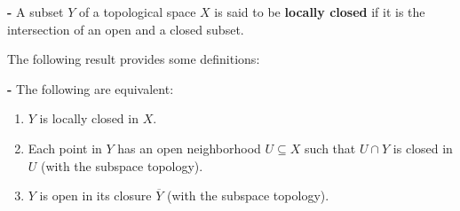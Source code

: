 \documentclass[12pt]{article}
\begin{document}
{\bf {} -} A subset $Y$ of a topological space $X$ is said to be {\bf locally closed} if it is the intersection of an open and a closed subset.

The following result provides some  definitions:

{\bf {} -} The following are equivalent:
\begin{enumerate}
\item $Y$ is locally closed in $X$.
\item Each point in $Y$ has an open neighborhood $U \subseteq X$ such that $U \cap Y$ is closed in $U$ (with the subspace topology).
\item $Y$ is open in its closure $\overline{Y}$ (with the subspace topology).
\end{enumerate}
\end{document}
